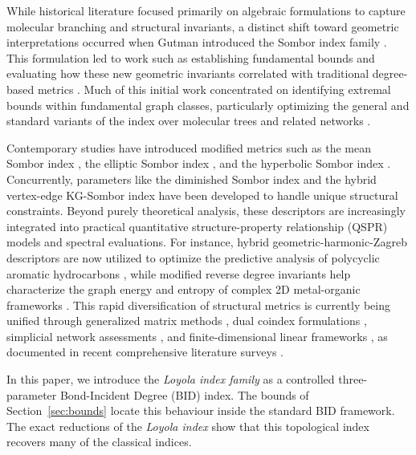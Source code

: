 \documentclass[a5paper, 10pt]{article}
\theoremstyle{plain}
\theoremstyle{remark}
\theoremstyle{definition}
\begin{document}
  While historical literature focused primarily on algebraic formulations
  to capture molecular branching and structural invariants, a distinct
  shift toward geometric interpretations occurred when Gutman introduced
  the Sombor index family \cite{Gutman2021Sombor, Gutman2021SomborBasic}.
  This formulation led to work such as establishing fundamental bounds
  \cite{MilovanovicMilovanovicMatejic2021Sombor} and evaluating how these
  new geometric invariants correlated with traditional degree-based metrics
  \cite{WangMaoLiFurtula2022SomborRelations}. Much of this initial work
  concentrated on identifying extremal bounds within fundamental graph
  classes, particularly optimizing the general and standard variants of the
  index over molecular trees and related networks
  \cite{DasCevikCangulShang2021Sombor, DasGutman2022SomborTrees,
  AhmadFarooqDas2025Extremal}.

   Contemporary studies have introduced modified metrics such as the mean
  Sombor index \cite{MendezBermudezAguilarSanchez2022MeanSombor}, the
  elliptic Sombor index \cite{GutmanFurtulaOz2024Elliptic}, and the
  hyperbolic Sombor index \cite{BarmanDas2026HSO}. Concurrently, parameters
  like the diminished Sombor index \cite{Movahedi2025DSO,
  MovahediGutmanRedzepovicFurtula2026} and the hybrid vertex-edge KG-Sombor
  index \cite{KosariDehgardiKhan2023Lower} have been developed to handle
  unique structural constraints. Beyond purely theoretical analysis, these
  descriptors are increasingly integrated into practical quantitative
  structure-property relationship (QSPR) models and spectral evaluations.
  For instance, hybrid geometric-harmonic-Zagreb descriptors are now
  utilized to optimize the predictive analysis of polycyclic aromatic
  hydrocarbons \cite{ArockiarajPaulClement2023Hybrid}, while modified
  reverse degree invariants help characterize the graph energy and entropy
  of complex 2D metal-organic frameworks \cite{KalaamGreeniArockiaraj2024}.
  This rapid diversification of structural metrics is currently being
  unified through generalized matrix methods
  \cite{ZuoRatherImranAli2022Modified}, dual coindex formulations
  \cite{GujiWali2025Lanzhou}, simplicial network assessments
  \cite{Shang2022Simplicial}, and finite-dimensional linear frameworks
  \cite{Rada2026LinearVDB}, as documented in recent comprehensive
  literature surveys \cite{Gutman2026SomborSurvey}.

  In this paper, we introduce
  the \emph{Loyola index family} as a controlled three-parameter
  Bond-Incident Degree (BID) index. The bounds of
  Section~\ref{sec:bounds} locate this behaviour inside the
  standard BID framework. The exact reductions of the \emph{Loyola index}
  show that this topological index recovers many of the
  classical indices.
\end{document}
